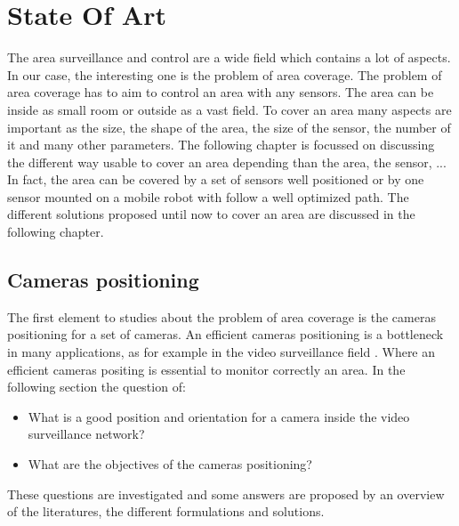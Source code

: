 \chapter{State Of Art}\label{chap:stateOfTheArt}

\minitoc

The area surveillance and control are a wide field which contains a lot of aspects. In our case, the interesting one is the problem of area coverage. 
The problem of area coverage has to aim to control an area with any sensors. The area can be inside as small room or outside as a vast field. To cover an area many aspects are important as the size, the shape of the area, the size of the sensor, the number of it and many other parameters. The following chapter is focussed on discussing the different way usable to cover an area depending than the area, the sensor, ... In fact, the area can be covered by a set of sensors well positioned or by one sensor mounted on a mobile robot with follow a well optimized path.
 The different solutions proposed until now to cover an area are discussed in the following chapter.


\section{Cameras positioning }\label{sec:camerasPositioning}
The first element to studies about the problem of area coverage is the cameras positioning for a set of cameras.
An efficient cameras positioning is a bottleneck in many applications, as for example in the video surveillance field \cite{11*herrera2012,12*soto2009,18*ding2012,151*zhao2013,84*xu2011}. Where an efficient cameras positing is essential to monitor correctly an area.  
In the following section the question of: 
\begin{itemize}
\item[ ] What is a good position and orientation for a camera inside the video surveillance network?
\item[ ]What are the objectives of the cameras positioning?

\end{itemize}
These questions are investigated and some answers are proposed by an overview of the literatures, the different formulations and solutions. 


